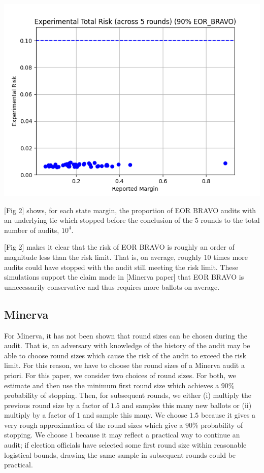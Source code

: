 \documentclass{article}
\begin{document}
\includegraphics[scale=.7]{eor_bravo_90perc_10^4_corrected/total_risk_with_alpha.png}

[Fig 2] shows, for each state margin,
the proportion of EOR BRAVO audits with an underlying
tie which stopped before the conclusion of the $5$ rounds to the 
total number of audits, $10^4$.

[Fig 2] makes it clear that the risk of EOR BRAVO is roughly
an order of magnitude less than the risk limit. 
That is, on average, roughly $10$ times more audits could have stopped 
with the audit still meeting the risk limit.
These simulations support the claim made in [Minerva paper]
that EOR BRAVO is unnecessarily conservative and thus requires
more ballots on average.



\subsection{Minerva}
For Minerva, it has not been shown that round sizes can be chosen
during the audit. That is, an adversary with knowledge of the history
of the audit may be able to choose round sizes which cause the 
risk of the audit to exceed the risk limit.
For this reason, we have to choose the round sizes of a Minerva 
audit a priori.
For this paper, we consider two choices of round sizes.
For both, we estimate and then use the minimum first round size 
which achieves
a $90\%$ probability of stopping.
Then, for subsequent rounds, we either (i) multiply the previous
round size by a factor of $1.5$ and samples this many new ballots 
or (ii) multiply by a factor of $1$ and sample this many.
We choose $1.5$ because it gives a very rough approximation of the
round sizes which give a $90\%$ probability of stopping.
We choose $1$ because it may reflect a practical way to continue an
audit; if election officials have selected some first round size within
reasonable logistical bounds, drawing the same sample in subsequent rounds
could be practical.
\end{document}
